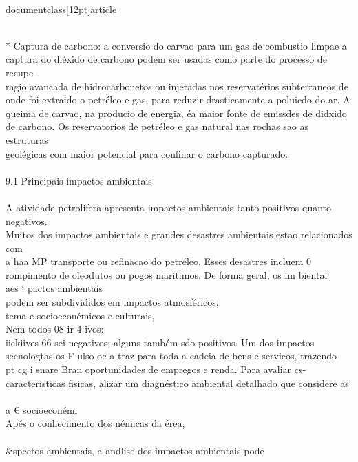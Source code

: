 \\documentclass[12pt]{article}
\begin{document}
\\
* Captura de carbono: a conversio do carvao para um gas de combustio limpae a\\
captura do diéxido de carbono podem ser usadas como parte do processo de recupe-\\
ragio avancada de hidrocarbonetos ou injetadas nos reservatérios subterraneos de\\
onde foi extraido o petréleo e gas, para reduzir drasticamente a poluicdo do ar. A\\
queima de carvao, na producio de energia, éa maior fonte de emissdes de didxido\\
de carbono. Os reservatorios de petréleo e gas natural nas rochas sao as estruturas\\
geolégicas com maior potencial para confinar o carbono capturado.\\
\\
9.1 Principais impactos ambientais\\
\\
A atividade petrolifera apresenta impactos ambientais tanto positivos quanto negativos.\\
Muitos dos impactos ambientais e grandes desastres ambientais estao relacionados com\\
a haa MP transporte ou refinacao do petréleo. Esses desastres incluem 0\\
rompimento de oleodutos ou pogos maritimos. De forma geral, os im bientai\\
aes ‘ pactos ambientais\\
podem ser subdivididos em impactos atmosféricos,\\
tema e socioeconémicos e culturais,\\
Nem todos 08 ir 4 ivos:\\
iiekiives 66 sei negativos; alguns também sdo positivos. Um dos impactos\\
secnologtas os F ulso oe a traz para toda a cadeia de bens e servicos, trazendo\\
pt cg i snare Bran oportunidades de empregos e renda. Para avaliar ¢s-\\
caracteristicas fisicas, alizar um diagnéstico ambiental detalhado que considere as\\
\\
a € socioeconémi\\
Apés o conhecimento dos némicas da érea,\\
\\&spectos ambientais, a andlise dos impactos ambientais pode\\
\end{document}
